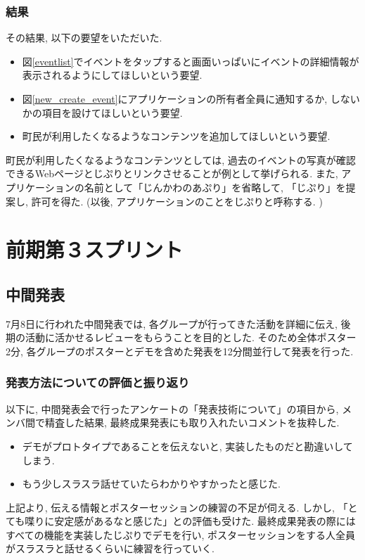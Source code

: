 \subsubsection{結果}
その結果, 以下の要望をいただいた.
\begin{itemize}
    \item 図\ref{eventlist}でイベントをタップすると画面いっぱいにイベントの詳細情報が表示されるようにしてほしいという要望.
    \item 図\ref{new_create_event}にアプリケーションの所有者全員に通知するか, しないかの項目を設けてほしいという要望.
    \item 町民が利用したくなるようなコンテンツを追加してほしいという要望.
\end{itemize}
町民が利用したくなるようなコンテンツとしては, 過去のイベントの写真が確認できるWebページとじぷりとリンクさせることが例として挙げられる.
また, アプリケーションの名前として「じんかわのあぷり」を省略して, 「じぷり」を提案し, 許可を得た. (以後, アプリケーションのことをじぷりと呼称する. )

\section{前期第３スプリント}

\subsection{中間発表}
7月8日に行われた中間発表では, 各グループが行ってきた活動を詳細に伝え, 後期の活動に活かせるレビューをもらうことを目的とした.
そのため全体ポスター2分, 各グループのポスターとデモを含めた発表を12分間並行して発表を行った.

\subsubsection{発表方法についての評価と振り返り}
以下に, 中間発表会で行ったアンケートの「発表技術について」の項目から, メンバ間で精査した結果, 最終成果発表にも取り入れたいコメントを抜粋した.
\begin{itemize}
  \item デモがプロトタイプであることを伝えないと, 実装したものだと勘違いしてしまう.
  \item もう少しスラスラ話せていたらわかりやすかったと感じた.
\end{itemize}
    上記より, 伝える情報とポスターセッションの練習の不足が伺える.
    しかし, 「とても喋りに安定感があるなと感じた」との評価も受けた. 最終成果発表の際にはすべての機能を実装したじぷりでデモを行い,
    ポスターセッションをする人全員がスラスラと話せるくらいに練習を行っていく.

